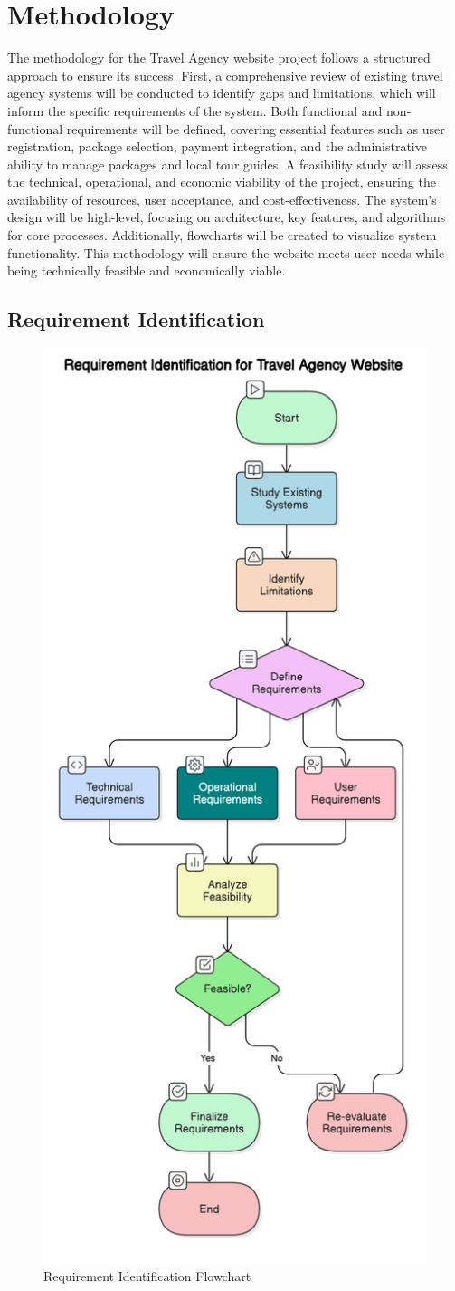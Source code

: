\section{Methodology}
The methodology for the Travel Agency website project follows a structured approach to ensure its success. First, a comprehensive review of existing travel agency systems will be conducted to identify gaps and limitations, which will inform the specific requirements of the system. Both functional and non-functional requirements will be defined, covering essential features such as user registration, package selection, payment integration, and the administrative ability to manage packages and local tour guides. A feasibility study will assess the technical, operational, and economic viability of the project, ensuring the availability of resources, user acceptance, and cost-effectiveness. The system's design will be high-level, focusing on architecture, key features, and algorithms for core processes. Additionally, flowcharts will be created to visualize system functionality. This methodology will ensure the website meets user needs while being technically feasible and economically viable.

\subsection{Requirement Identification}
\begin{figure}[H]  %
    \centering
    \includegraphics[width=0.5\linewidth]{./Images/flow.png}
    \caption{Requirement Identification Flowchart}
    \label{fig:Requirement Identification Flowchart}
\end{figure}




